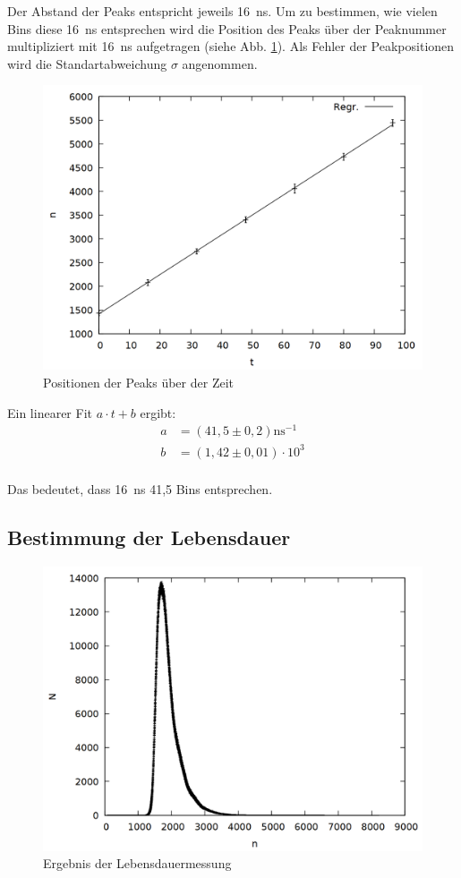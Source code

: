 Der Abstand der Peaks entspricht jeweils \SI{16}{\nano\second}. Um zu bestimmen, wie vielen Bins diese \SI{16}{\nano\second} entsprechen wird die Position des Peaks über der Peaknummer multipliziert mit \SI{16}{\nano\second} aufgetragen (siehe Abb. \ref{fig:prompt_time}). Als Fehler der Peakpositionen wird die Standartabweichung $\sigma$ angenommen.  

\begin{figure}
\centering
\includegraphics[width=0.7\linewidth]{data/prompt_time.png}
\caption{Positionen der Peaks über der Zeit}
\label{fig:prompt_time}
\end{figure}

Ein linearer Fit $a\cdot t + b$ ergibt:\\
\begin{align*}
a &= (41,5 \pm 0,2) \si{\nano\second}^{-1}\\
b &= (1,42 \pm 0,01) \cdot 10^{3}\\
\end{align*}

Das bedeutet, dass \SI{16}{\nano\second} 41,5 Bins entsprechen.

\subsection{Bestimmung der Lebensdauer}

\begin{figure}
\centering
\includegraphics[width=0.7\linewidth]{data/uebernacht.png}
\caption{Ergebnis der Lebensdauermessung}
\label{fig:halflife}
\end{figure}

